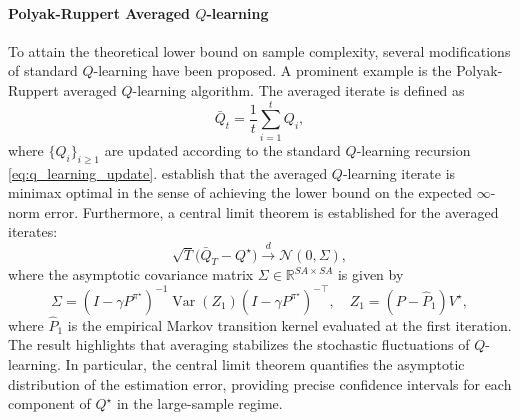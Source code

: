\documentclass{article}
\numberwithin{equation}{section}
\begin{document}
\paragraph{Polyak-Ruppert Averaged $Q$-learning} 
To attain the theoretical lower bound on sample complexity, several modifications of standard $Q$-learning have been proposed. A prominent example is the Polyak-Ruppert averaged $Q$-learning algorithm. The averaged iterate is defined as
\[
    \bar{Q}_t = \frac{1}{t}\sum_{i=1}^{t} Q_i,
\]
where \(\{Q_i\}_{i\ge 1}\) are updated according to the standard $Q$-learning recursion \eqref{eq:q_learning_update}.  
\cite{li2023statistical} establish that the averaged $Q$-learning iterate is minimax optimal in the sense of achieving the lower bound on the expected \(\infty\)-norm error. Furthermore, a central limit theorem is established for the averaged iterates:
\begin{equation}
    \sqrt{T}\bigl(\bar{Q}_T - Q^\star\bigr) \xrightarrow{d} \mathcal{N}(0, \Sigma),
\end{equation}
where the asymptotic covariance matrix \(\Sigma \in \mathbb{R}^{SA \times SA}\) is given by
\begin{equation}
    \Sigma = (I - \gamma P^{\pi^\star})^{-1} \operatorname{Var}(Z_1) (I - \gamma P^{\pi^\star})^{-\top}, 
    \quad Z_1 = (P - \widehat{P}_1) V^\star,
\end{equation}
where $\widehat{P}_1$ is the empirical Markov transition kernel evaluated at the first iteration. The result highlights that averaging stabilizes the stochastic fluctuations of $Q$-learning. In particular, the central limit theorem quantifies the asymptotic distribution of the estimation error, providing precise confidence intervals for each component of $Q^\star$ in the large-sample regime.

    
\end{document}
